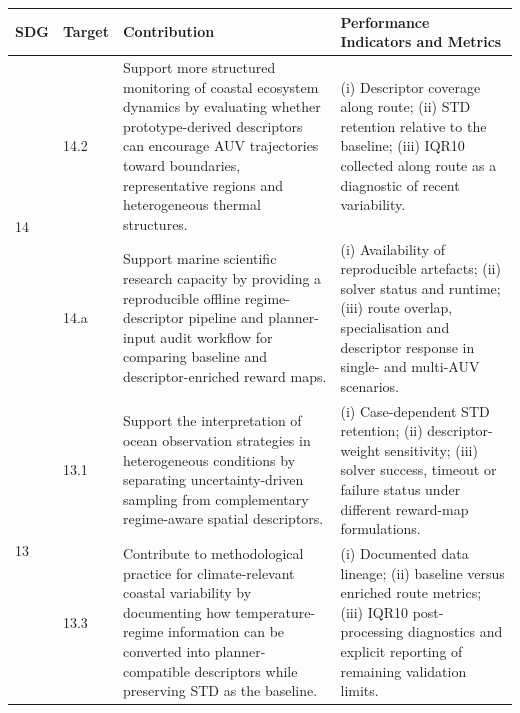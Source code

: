 \begin{center}
\begin{tabular}{|l|l|p{58mm}|p{52mm}|}
\hline
\textbf{SDG} & \textbf{Target} & \textbf{Contribution} & \textbf{Performance Indicators and Metrics} \\
\hline
\hline

\multirow{2}{*}{14} &
14.2 &
Support more structured monitoring of coastal ecosystem dynamics by evaluating whether prototype-derived descriptors can encourage AUV trajectories toward boundaries, representative regions and heterogeneous thermal structures. &
(i) Descriptor coverage along route; (ii) STD retention relative to the baseline; (iii) IQR10 collected along route as a diagnostic of recent variability. \\
\cline{2-4}

&
14.a &
Support marine scientific research capacity by providing a reproducible offline regime-descriptor pipeline and planner-input audit workflow for comparing baseline and descriptor-enriched reward maps. &
(i) Availability of reproducible artefacts; (ii) solver status and runtime; (iii) route overlap, specialisation and descriptor response in single- and multi-AUV scenarios. \\
\hline

\multirow{2}{*}{13} &
13.1 &
Support the interpretation of ocean observation strategies in heterogeneous conditions by separating uncertainty-driven sampling from complementary regime-aware spatial descriptors. &
(i) Case-dependent STD retention; (ii) descriptor-weight sensitivity; (iii) solver success, timeout or failure status under different reward-map formulations. \\
\cline{2-4}

&
13.3 &
Contribute to methodological practice for climate-relevant coastal variability by documenting how temperature-regime information can be converted into planner-compatible descriptors while preserving STD as the baseline. &
(i) Documented data lineage; (ii) baseline versus enriched route metrics; (iii) IQR10 post-processing diagnostics and explicit reporting of remaining validation limits. \\
\hline

\end{tabular}
\end{center}
